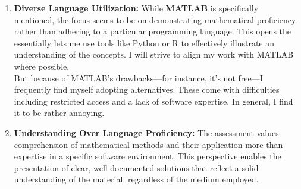 \documentclass[a4paper, 12pt]{report}
\begin{document}
    \begin{enumerate}
        \item \textbf{Diverse Language Utilization:} While \textbf{MATLAB} is specifically mentioned, the focus seems to be on demonstrating mathematical proficiency rather than adhering to a particular programming language. This opens the essentially lets me use tools like Python or R to effectively illustrate an understanding of the concepts. I will strive to align my work with MATLAB where possible.\\[1em]
        But because of MATLAB's drawbacks—for instance, it's not free—I frequently find myself adopting alternatives. These come with difficulties including restricted access and a lack of software expertise. In general, I find it to be rather annoying.  
                
        \item \textbf{Understanding Over Language Proficiency:} The assessment values comprehension of mathematical methods and their application more than expertise in a specific software environment. This perspective enables the presentation of clear, well-documented solutions that reflect a solid understanding of the material, regardless of the medium employed.
    \end{enumerate}
\end{document}
